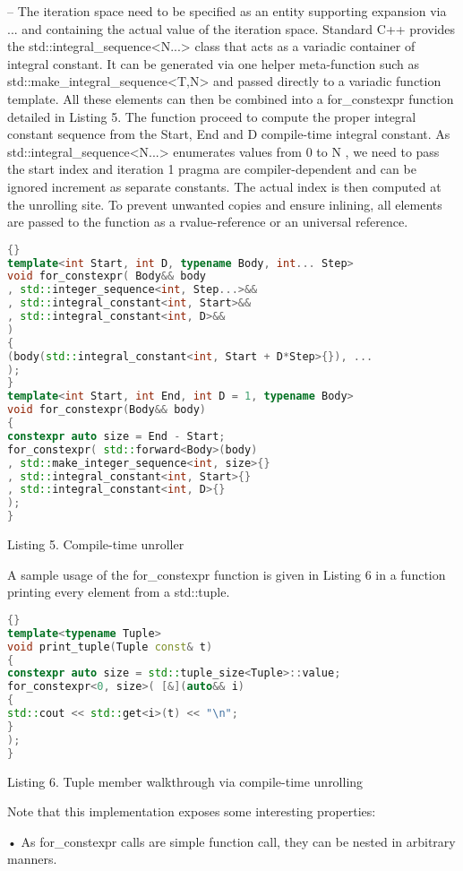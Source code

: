 \documentclass[../../main.tex]{subfiles}
\begin{document}
– The iteration space need to be specified
as an entity supporting expansion via ...
and containing the actual value of the
iteration space. Standard C++ provides the
std::integral_sequence<N...> class that
acts as a variadic container of integral constant. It
can be generated via one helper meta-function such
as std::make_integral_sequence<T,N>
and passed directly to a variadic function template.
All these elements can then be combined into a
for_constexpr function detailed in Listing 5.
The function proceed to compute the proper
integral constant sequence from the Start,
End and D compile-time integral constant. As
std::integral_sequence<N...> enumerates values
from 0 to N , we need to pass the start index and iteration
1 pragma are compiler-dependent and can be ignored
increment as separate constants. The actual index is then
computed at the unrolling site. To prevent unwanted copies
and ensure inlining, all elements are passed to the function
as a rvalue-reference or an universal reference.

\begin{lstlisting}[language=c++]{}
template<int Start, int D, typename Body, int... Step>
void for_constexpr( Body&& body
, std::integer_sequence<int, Step...>&&
, std::integral_constant<int, Start>&&
, std::integral_constant<int, D>&&
)
{
(body(std::integral_constant<int, Start + D*Step>{}), ...
);
}
template<int Start, int End, int D = 1, typename Body>
void for_constexpr(Body&& body)
{
constexpr auto size = End - Start;
for_constexpr( std::forward<Body>(body)
, std::make_integer_sequence<int, size>{}
, std::integral_constant<int, Start>{}
, std::integral_constant<int, D>{}
);
}
\end{lstlisting}
Listing 5. Compile-time unroller

A sample usage of the for_constexpr function is given
in Listing 6 in a function printing every element from a
std::tuple.

\begin{lstlisting}[language=c++]{}
template<typename Tuple>
void print_tuple(Tuple const& t)
{
constexpr auto size = std::tuple_size<Tuple>::value;
for_constexpr<0, size>( [&](auto&& i)
{
std::cout << std::get<i>(t) << "\n";
}
);
}
\end{lstlisting}
Listing 6. Tuple member walkthrough via compile-time unrolling

Note that this implementation exposes some interesting
properties:

• As for_constexpr calls are simple function call, they
can be nested in arbitrary manners.
\end{document}
